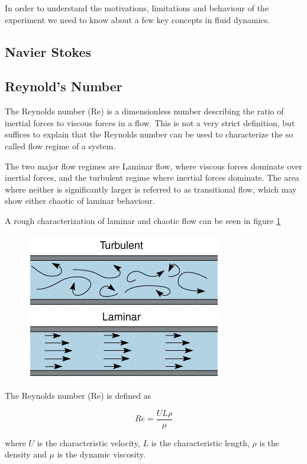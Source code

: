 
In order to understand the motivations, limitations and behaviour of the experiment we need to know about a few key concepts in fluid dynamics.

\subsection{Navier Stokes}


\subsection{Reynold's Number}
The Reynolds number (Re) is a dimensionless number describing the ratio of inertial forces to viscous forces in a flow. This is not a very strict definition, but suffices to explain that the Reynolds number can be used to characterize the so called flow regime of a system. 

The two major flow regimes are Laminar flow, where viscous forces dominate over inertial forces, and the turbulent regime where inertial forces dominate. The area where neither is significantly larger is referred to as transitional flow, which may show either chaotic of laminar behaviour. 

A rough characterization of laminar and chaotic flow can be seen in figure \ref{fig:laminar_flow}

\begin{figure}\label{fig:laminar_flow}
\includegraphics{Images/laminarFlow.png}
\end{figure}

The Reynolds number (Re) is defined as \cite{introfluid}

\begin{equation}\label{eq:reynolds}
Re = \frac{U L \rho}{\mu}
\end{equation}

where $U$ is the characteristic velocity, $L$ is the characteristic length, $\rho$ is the density and $\mu$ is the dynamic viscosity. 

